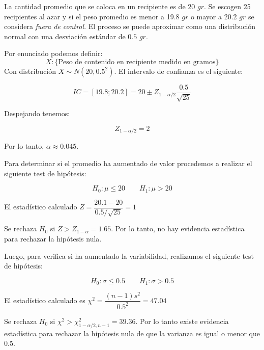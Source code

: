 
\addpoints
\question[20] La cantidad promedio que se coloca en un recipiente es de 20 $gr$. Se escogen 25 recipientes al azar y si el peso promedio es menor a 19.8 $gr$ o mayor a 20.2 $gr$ se considera \textit{fuera de control}. El proceso se puede aproximar como una distribución normal con una desviación estándar de $0.5$ $gr$.


\noaddpoints
{}

\begin{solution}
Por enunciado podemos definir:
$$X :\{ \text{Peso de contenido en recipiente medido en gramos} \}$$
Con distribución $X\sim N(20,0.5^2)$. El intervalo de confianza es el siguiente:

$$IC = [19.8; 20.2]= 20 \pm Z_{1-\alpha/2}\dfrac{0.5}{\sqrt{25}}$$

Despejando tenemos:

$$Z_{1-\alpha/2} = 2$$

Por lo tanto, $\alpha \approx 0.045$.

Para determinar si el promedio ha aumentado de valor procedemos a realizar el siguiente test de hipótesis:

$$H_0:\mu \leq 20 \quad \quad   H_1: \mu >20$$

El estadístico calculado $Z=\dfrac{20.1-20}{0.5/\sqrt{25}}=1$

Se rechaza $H_0$ si $Z>Z_{1-\alpha}=1.65$. Por lo tanto, no hay evidencia estadística para rechazar la hipótesis nula.

Luego, para verifica si ha aumentado la variabilidad, realizamos el siguiente test de hipótesis:

$$H_0:\sigma \leq 0.5 \quad \quad   H_1: \sigma >0.5$$

El estadístico calculado es $\chi^2=\dfrac{(n-1)s^2}{0.5^2}=47.04$

Se rechaza $H_0$ si $\chi^2>\chi_{1-\alpha/2, n-1}^2=39.36$.
Por lo tanto existe evidencia estadística para rechazar la hipótesis nula de que la varianza es igual o menor que $0.5$.
\end{solution}